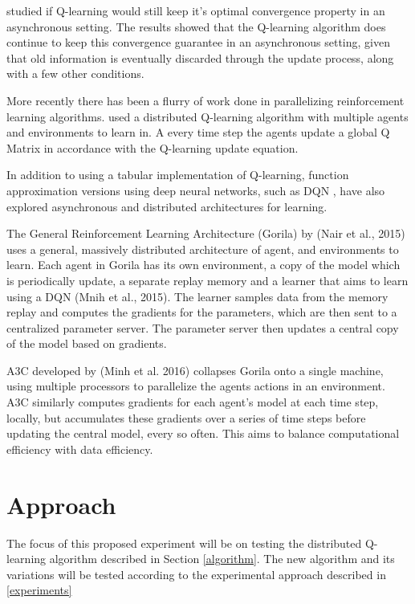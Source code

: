 \documentclass[jair,twoside,11pt,theapa]{article}
\begin{document}
\cite{Tsitsiklis1994} studied if Q-learning would still keep it's optimal convergence property in an asynchronous setting. The results showed that the Q-learning algorithm does continue to keep this convergence guarantee in an asynchronous setting, given that old information is eventually discarded through the update process, along with a few other conditions. 

More recently there has been a flurry of work done in parallelizing reinforcement learning algorithms. \cite{MANNION2015956} used a distributed Q-learning algorithm with multiple agents and environments to learn in. A every time step the agents update a global Q Matrix in accordance with the Q-learning update equation. 

In addition to using a tabular implementation of Q-learning, function approximation versions using deep neural networks, such as DQN \cite{Mnih2013}, have also explored asynchronous and distributed architectures for learning. 

The General Reinforcement Learning Architecture (Gorila) by (Nair et al., 2015) uses a general, massively distributed architecture of agent, and environments to learn. Each agent in Gorila has its own environment, a copy of the model which is periodically update, a separate replay memory and a learner that aims to learn using a DQN (Mnih et al., 2015). The learner samples data from the memory replay and computes the gradients for the parameters, which are then sent to a centralized parameter server. The parameter server then updates a central copy of the model based on gradients. 

A3C developed by (Minh et al. 2016) collapses Gorila onto a single machine, using multiple processors to parallelize the agents actions in an environment. A3C similarly computes gradients for each agent's model at each time step, locally, but accumulates these gradients over a series of time steps before updating the central model, every so often. This aims to balance computational efficiency with data efficiency. 


\section{Approach}
\label{Approach}
The focus of this proposed experiment will be on testing the distributed Q-learning algorithm described in Section \ref{algorithm}.
The new algorithm and its variations will be tested according to the experimental approach described in \ref{experiments}
\end{document}
